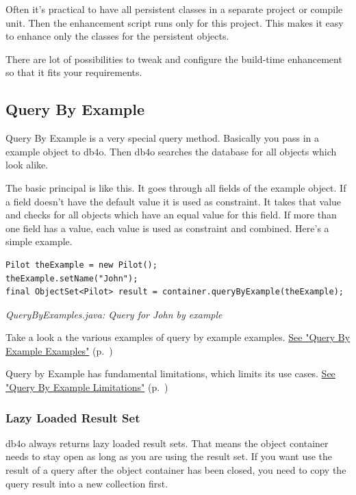 Often it's practical to have all persistent classes in a separate project or compile unit. Then the enhancement script runs only for this project. This makes it easy to enhance only the classes for the persistent objects.

There are lot of possibilities to tweak and configure the build-time enhancement so that it fits your requirements.

\subsection{Query By Example}
\label{ref:basics-querying-query-by-example}

Query By Example is a very special query method. Basically you pass in a example object to db4o. Then db4o searches the database for all objects which look alike.

The basic principal is like this. It goes through all fields of the example object. If a field doesn't have the default value it is used as constraint. It takes that value and checks for all objects which have an equal value for this field. If more than one field has a value, each value is used as constraint and combined. Here's a simple example.

\begin{lstlisting}
Pilot theExample = new Pilot();
theExample.setName("John");
final ObjectSet<Pilot> result = container.queryByExample(theExample);
\end{lstlisting}

{\small\itshape QueryByExamples.java: Query for John by example\par}
\medskip

Take a look a the various examples of query by example examples. \hyperref[ref:basics-querying-query-by-example-qby-examples]{See "Query By Example Examples"} (p.~\pageref{ref:basics-querying-query-by-example-qby-examples})

Query by Example has fundamental limitations, which limits its use cases. \hyperref[ref:basics-querying-query-by-example-qbe-limitations]{See "Query By Example Limitations"} (p.~\pageref{ref:basics-querying-query-by-example-qbe-limitations})

\subsubsection*{Lazy Loaded Result Set}

db4o always returns lazy loaded result sets. That means the object container needs to stay open as long as you are using the result set. If you want use the result of a query after the object container has been closed, you need to copy the query result into a new collection first.

